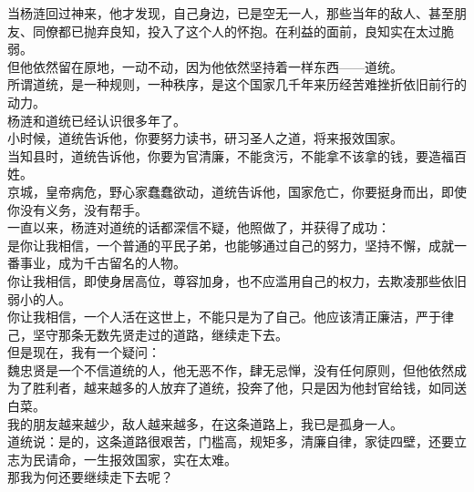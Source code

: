 \begin{multicols}{\theparacolNo}
当杨涟回过神来，他才发现，自己身边，已是空无一人，那些当年的敌人、甚至朋友、同僚都已抛弃良知，投入了这个人的怀抱。在利益的面前，良知实在太过脆弱。\\

但他依然留在原地，一动不动，因为他依然坚持着一样东西——道统。\\

所谓道统，是一种规则，一种秩序，是这个国家几千年来历经苦难挫折依旧前行的动力。\\

杨涟和道统已经认识很多年了。\\

小时候，道统告诉他，你要努力读书，研习圣人之道，将来报效国家。\\

当知县时，道统告诉他，你要为官清廉，不能贪污，不能拿不该拿的钱，要造福百姓。\\

京城，皇帝病危，野心家蠢蠢欲动，道统告诉他，国家危亡，你要挺身而出，即使你没有义务，没有帮手。\\

一直以来，杨涟对道统的话都深信不疑，他照做了，并获得了成功：\\

是你让我相信，一个普通的平民子弟，也能够通过自己的努力，坚持不懈，成就一番事业，成为千古留名的人物。\\

你让我相信，即使身居高位，尊容加身，也不应滥用自己的权力，去欺凌那些依旧弱小的人。\\

你让我相信，一个人活在这世上，不能只是为了自己。他应该清正廉洁，严于律己，坚守那条无数先贤走过的道路，继续走下去。\\

但是现在，我有一个疑问：\\

魏忠贤是一个不信道统的人，他无恶不作，肆无忌惮，没有任何原则，但他依然成为了胜利者，越来越多的人放弃了道统，投奔了他，只是因为他封官给钱，如同送白菜。\\

我的朋友越来越少，敌人越来越多，在这条道路上，我已是孤身一人。\\

道统说：是的，这条道路很艰苦，门槛高，规矩多，清廉自律，家徒四壁，还要立志为民请命，一生报效国家，实在太难。\\

那我为何还要继续走下去呢？\\


\end{multicols}

